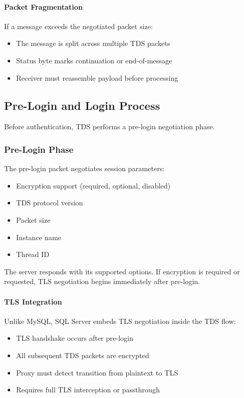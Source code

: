\paragraph{Packet Fragmentation}

If a message exceeds the negotiated packet size:
\begin{itemize}
    \item The message is split across multiple TDS packets
    \item Status byte marks continuation or end-of-message
    \item Receiver must reassemble payload before processing
\end{itemize}

\subsection{Pre-Login and Login Process}

Before authentication, TDS performs a pre-login negotiation phase.

\subsubsection{Pre-Login Phase}

The pre-login packet negotiates session parameters:

\begin{itemize}
    \item Encryption support (required, optional, disabled)
    \item TDS protocol version
    \item Packet size
    \item Instance name
    \item Thread ID
\end{itemize}

The server responds with its supported options. If encryption is required or requested, TLS negotiation begins immediately after pre-login.

\paragraph{TLS Integration}

Unlike MySQL, SQL Server embeds TLS negotiation inside the TDS flow:
\begin{itemize}
    \item TLS handshake occurs after pre-login
    \item All subsequent TDS packets are encrypted
    \item Proxy must detect transition from plaintext to TLS
    \item Requires full TLS interception or passthrough
\end{itemize}

